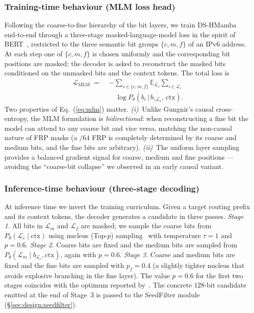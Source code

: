 \documentclass[conference]{IEEEtran}
\begin{document}
\subsubsection{Training-time behaviour (MLM loss head)}
Following the coarse-to-fine hierarchy of the bit layers, we
train DS-HMamba end-to-end through a three-stage
masked-language-model loss in the spirit of
BERT~\cite{devlin2019bert}, restricted to the three semantic
bit groups $\{c,m,f\}$ of an IPv6 address.  At each step one
of $\{c,m,f\}$ is chosen uniformly and the corresponding bit
positions are masked; the decoder is asked to reconstruct the
masked bits conditioned on the unmasked bits and the context
tokens.  The total loss is
\begin{equation}
\begin{split}
\mathcal{L}_{\mathrm{MLM}}
\;=\;& -\!\!\sum_{s\in\{c,m,f\}}\!
   \mathbb{E}_{\mathcal{L}_s}\!\!\sum_{i\in\mathcal{L}_s}\\
&\quad
\log P_\theta\!\left(b_i \,\big|\, b_{\setminus \mathcal{L}_s},\,\text{ctx}\right).
\end{split}
\label{eq:mlm}
\end{equation}
Two properties of Eq.~(\ref{eq:mlm}) matter.
\emph{(i)}~Unlike Gungnir's causal cross-entropy, the MLM
formulation is \emph{bidirectional}: when reconstructing a fine
bit the model can attend to any coarse bit and vice versa,
matching the non-causal nature of FRP masks (a $/64$ FRP is
completely determined by its coarse and medium bits, and the
fine bits are arbitrary).
\emph{(ii)}~The uniform layer sampling provides a balanced
gradient signal for coarse, medium and fine positions ---
avoiding the ``coarse-bit collapse'' we observed in an early
causal variant.

\subsubsection{Inference-time behaviour (three-stage decoding)}
At inference time we invert the training curriculum.  Given a
target routing prefix and its context tokens, the decoder
generates a candidate in three passes.
\emph{Stage 1.}  All bits in $\mathcal{L}_m$ and $\mathcal{L}_f$
are masked; we sample the coarse bits from
$P_\theta(\mathcal{L}_c\!\mid\!\text{ctx})$ using nucleus
(Top-$p$) sampling~\cite{holtzman2020top-p} with temperature
$\tau{=}1$ and $p{=}0.6$.
\emph{Stage 2.}  Coarse bits are fixed and the medium bits are
sampled from
$P_\theta(\mathcal{L}_m\!\mid\!b_{\mathcal{L}_c},\text{ctx})$,
again with $p{=}0.6$.
\emph{Stage 3.}  Coarse and medium bits are fixed and the fine
bits are sampled with $p_f{=}0.4$ (a slightly tighter nucleus
that avoids explosive branching in the fine layer).  The value
$p{=}0.6$ for the first two stages coincides with the optimum
reported by~\cite{wei2025gungnir}.  The concrete
$128$-bit candidate emitted at the end of Stage~3 is passed to
the SeedFilter module (\S\ref{sec:design:seedfilter}).
\end{document}
